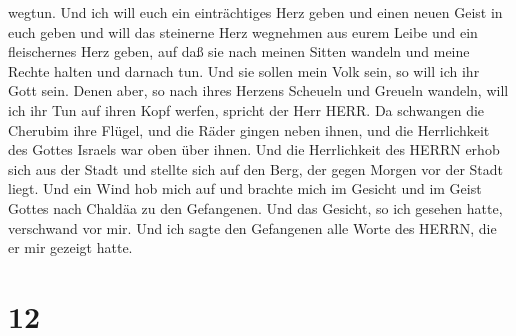 wegtun.  Und ich will euch ein einträchtiges Herz geben und
einen neuen Geist in euch geben und will das steinerne Herz wegnehmen
aus eurem Leibe und ein fleischernes Herz geben,  auf daß
sie nach meinen Sitten wandeln und meine Rechte halten und darnach tun.
Und sie sollen mein Volk sein, so will ich ihr Gott sein. 
Denen aber, so nach ihres Herzens Scheueln und Greueln wandeln, will ich
ihr Tun auf ihren Kopf werfen, spricht der Herr HERR.  Da
schwangen die Cherubim ihre Flügel, und die Räder gingen neben ihnen,
und die Herrlichkeit des Gottes Israels war oben über ihnen.
 Und die Herrlichkeit des HERRN erhob sich aus der Stadt
und stellte sich auf den Berg, der gegen Morgen vor der Stadt liegt.
 Und ein Wind hob mich auf und brachte mich im Gesicht und
im Geist Gottes nach Chaldäa zu den Gefangenen. Und das Gesicht, so ich
gesehen hatte, verschwand vor mir.  Und ich sagte den
Gefangenen alle Worte des HERRN, die er mir gezeigt hatte.

\hypertarget{section-11}{%
\section{12}\label{section-11}}

